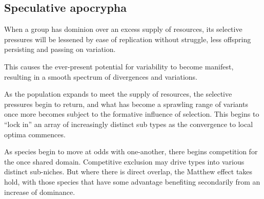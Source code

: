 %
%
%


\subsection*{Speculative apocrypha}



When a group has dominion over an excess supply of resources, its selective pressures will be lessened by ease of replication without struggle, less offspring persisting and passing on variation.

This causes the ever-present potential for variability to become manifest, resulting in a smooth spectrum of divergences and variations. 

As the population expands to meet the supply of resources, the selective pressures begin to return, and what has become a sprawling range of variants once more becomes subject to the formative influence of selection. This begins to ``lock in'' an array of increasingly distinct sub types as the convergence to local optima commences. 

As species begin to move at odds with one-another, there begins competition for the once shared domain. Competitive exclusion may drive types into various distinct sub-niches. But where there is direct overlap, the Matthew effect takes hold, with those species that have some advantage benefiting secondarily from an increase of dominance. 

